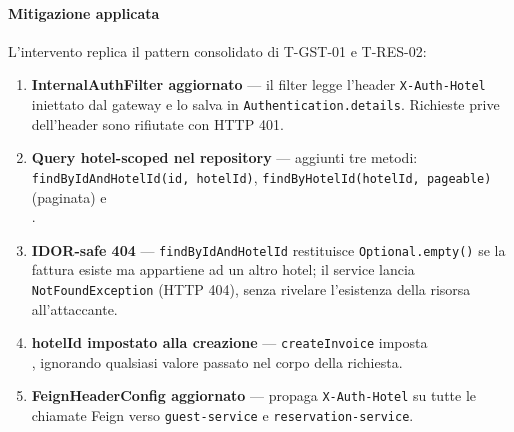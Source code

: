 ﻿\documentclass[a4paper,12pt]{report}
\begin{document}
\paragraph{Mitigazione applicata}
L'intervento replica il pattern consolidato di T-GST-01 e T-RES-02:

\begin{enumerate}
    \item \textbf{InternalAuthFilter aggiornato} --- il filter legge l'header
          \texttt{X-Auth-Hotel} iniettato dal gateway e lo salva in
          \texttt{Authentication.details}. Richieste prive dell'header sono
          rifiutate con HTTP 401.
    \item \textbf{Query hotel-scoped nel repository} --- aggiunti tre metodi:\\
          \texttt{findByIdAndHotelId(id, hotelId)},
          \texttt{findByHotelId(hotelId, pageable)} (paginata) e\\
          \texttt{}.
    \item \textbf{IDOR-safe 404} --- \texttt{findByIdAndHotelId} restituisce
          \texttt{Optional.empty()} se la fattura esiste ma appartiene ad
          un altro hotel; il service lancia \texttt{NotFoundException} (HTTP 404),
          senza rivelare l'esistenza della risorsa all'attaccante.
    \item \textbf{hotelId impostato alla creazione} --- \texttt{createInvoice} imposta\\
          \texttt{}, ignorando qualsiasi valore
          passato nel corpo della richiesta.
    \item \textbf{FeignHeaderConfig aggiornato} --- propaga \texttt{X-Auth-Hotel} su
          tutte le chiamate Feign verso \texttt{guest-service} e
          \texttt{reservation-service}.
\end{enumerate}
\end{document}
